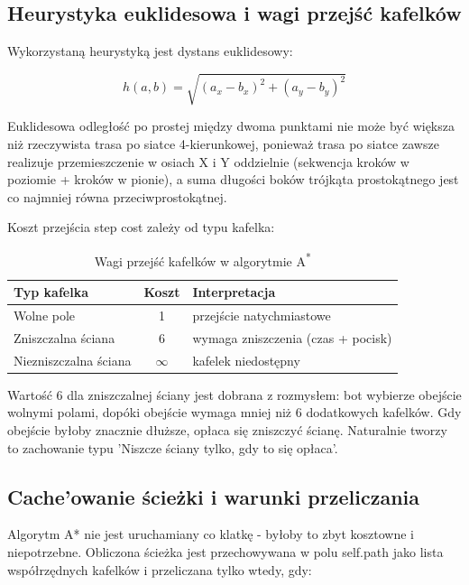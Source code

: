 \subsection{Heurystyka euklidesowa i wagi przejść kafelków}

Wykorzystaną heurystyką jest dystans euklidesowy:
 
\begin{equation}
h(a, b) = \sqrt{(a_x - b_x)^2 + (a_y - b_y)^2}
\end{equation}
 
Euklidesowa odległość po prostej między dwoma punktami nie może być większa niż rzeczywista trasa po siatce 
4-kierunkowej, ponieważ trasa po siatce zawsze realizuje przemieszczenie w osiach X i Y oddzielnie 
(sekwencja kroków w poziomie + kroków w pionie), a suma długości boków trójkąta prostokątnego jest co najmniej 
równa przeciwprostokątnej.
 
Koszt przejścia step cost zależy od typu kafelka:
 
\begin{table}[H]
    \centering
    \caption{Wagi przejść kafelków w algorytmie A\textsuperscript{*}}
    \label{tab:astar_weights}
    \begin{tabular}{|l|c|l|}
        \hline
        \textbf{Typ kafelka} & \textbf{Koszt} & \textbf{Interpretacja} \\
        \hline
        Wolne pole              & 1   & przejście natychmiastowe \\
        Zniszczalna ściana      & 6   & wymaga zniszczenia (czas + pocisk) \\
        Niezniszczalna ściana   & $\infty$ & kafelek niedostępny \\
        \hline
    \end{tabular}
\end{table}
 
Wartość 6 dla zniszczalnej ściany jest dobrana z rozmysłem: bot wybierze obejście wolnymi polami, 
dopóki obejście wymaga mniej niż 6 dodatkowych kafelków. Gdy obejście byłoby znacznie dłuższe, opłaca się zniszczyć 
ścianę. Naturalnie tworzy to zachowanie typu 'Niszcze ściany tylko, gdy to się opłaca'.

\subsection{Cache'owanie ścieżki i warunki przeliczania}

Algorytm A* nie jest uruchamiany co klatkę - byłoby to zbyt kosztowne i niepotrzebne. 
Obliczona ścieżka jest przechowywana w polu self.path jako lista współrzędnych kafelków i przeliczana tylko wtedy, gdy:
 

